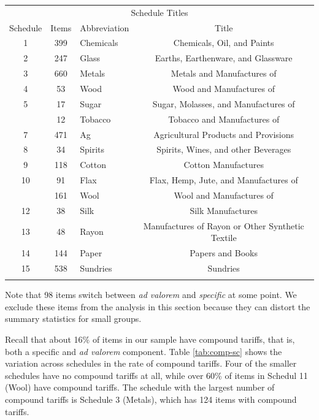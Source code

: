 \documentclass[
  12pt,
]{article}
\begin{document}
\begin{table}[!h]
\centering
\begin{tabular}{cclc}
\toprule
\multicolumn{4}{c}{\bgroup\fontsize{12}{14}\selectfont Schedule Titles\egroup{}} \\
\cmidrule(l{3pt}r{3pt}){1-4}{}
Schedule & Items & Abbreviation & Title\\
\midrule{}
1 & 399 & Chemicals & Chemicals, Oil, and Paints\\
2 & 247 & Glass & Earths, Earthenware, and Glassware\\
3 & 660 & Metals & Metals and Manufactures of\\
4 & 53 & Wood & Wood and Manufactures of\\
5 & 17 & Sugar & Sugar, Molasses, and Manufactures of\\
\addlinespace
6 & 12 & Tobacco & Tobacco and Manufactures of\\
7 & 471 & Ag & Agricultural Products and Provisions\\
8 & 34 & Spirits & Spirits, Wines, and other Beverages\\
9 & 118 & Cotton & Cotton Manufactures\\
10 & 91 & Flax & Flax, Hemp, Jute, and Manufactures of\\
\addlinespace
11 & 161 & Wool & Wool and Manufactures of\\
12 & 38 & Silk & Silk Manufactures\\
13 & 48 & Rayon & Manufactures of Rayon or Other Synthetic Textile\\
14 & 144 & Paper & Papers and Books\\
15 & 538 & Sundries & Sundries\\
\bottomrule{}
\end{tabular}
\end{table}

Note that 98 items switch between \emph{ad valorem} and \emph{specific} at some point. We exclude these items from the analysis in this section because they can distort the summary statistics for small groups.

Recall that about 16\% of items in our sample have compound tariffs, that is, both a specific and \emph{ad valorem} component. Table \ref{tab:comp-sc} shows the variation across schedules in the rate of compound tariffs. Four of the smaller schedules have no compound tariffs at all, while over 60\% of items in Schedul 11 (Wool) have compound tariffs. The schedule with the largest number of compound tariffs is Schedule 3 (Metals), which has 124 items with compound tariffs.
\end{document}
